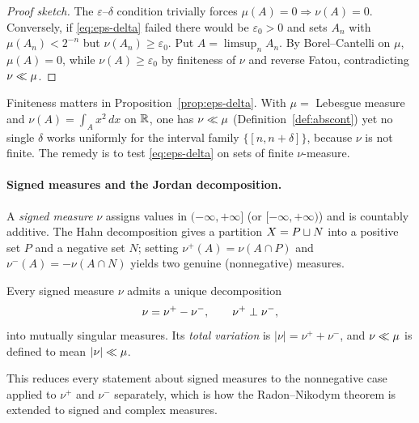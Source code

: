 \begin{proof}[Proof sketch]
The $\varepsilon$--$\delta$ condition trivially forces $\mu(A)=0 \Rightarrow
\nu(A) = 0$. Conversely, if \eqref{eq:eps-delta} failed there would be
$\varepsilon_0 > 0$ and sets $A_n$ with $\mu(A_n) < 2^{-n}$ but
$\nu(A_n) \ge \varepsilon_0$. Put $A = \limsup_n A_n$. By Borel--Cantelli on
$\mu$, $\mu(A) = 0$, while $\nu(A) \ge \varepsilon_0$ by finiteness of $\nu$ and
reverse Fatou, contradicting $\nu \ll \mu$.
\end{proof}

\begin{remark}
Finiteness matters in Proposition~\ref{prop:eps-delta}. With
$\mu = $ Lebesgue measure and $\nu(A) = \int_A x^2\,dx$ on $\mathbb{R}$, one has
$\nu \ll \mu$ (Definition~\ref{def:abscont}) yet no single $\delta$ works
uniformly for the interval family $\{[n, n+\delta]\}$, because $\nu$ is not
finite. The remedy is to test \eqref{eq:eps-delta} on sets of finite $\nu$-measure.
\end{remark}

\paragraph{Signed measures and the Jordan decomposition.}
A \emph{signed measure} $\nu$ assigns values in $(-\infty, +\infty]$ (or
$[-\infty, +\infty)$) and is countably additive. The Hahn decomposition gives a
partition $X = P \sqcup N$ into a positive set $P$ and a negative set $N$;
setting $\nu^+(A) = \nu(A \cap P)$ and $\nu^-(A) = -\nu(A \cap N)$ yields two
genuine (nonnegative) measures.

\begin{proposition}
\label{prop:jordan}
Every signed measure $\nu$ admits a unique decomposition
\begin{equation}
  \nu = \nu^+ - \nu^-, \qquad \nu^+ \perp \nu^-,
\end{equation}
into mutually singular measures. Its \emph{total variation} is
$\lvert \nu \rvert = \nu^+ + \nu^-$, and $\nu \ll \mu$ is defined to mean
$\lvert \nu \rvert \ll \mu$.
\end{proposition}

This reduces every statement about signed measures to the nonnegative case
applied to $\nu^+$ and $\nu^-$ separately, which is how the Radon--Nikodym
theorem is extended to signed and complex measures.
